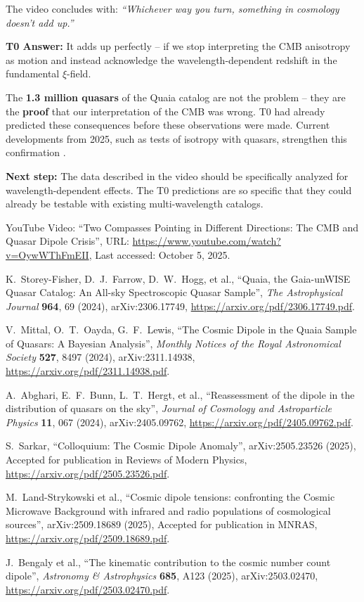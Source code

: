 \documentclass{article}
\begin{document}
	The video concludes with: \textit{``Whichever way you turn, something in cosmology doesn't add up.''}
	
	\textbf{T0 Answer:} It adds up perfectly -- if we stop interpreting the CMB anisotropy as motion and instead acknowledge the wavelength-dependent redshift in the fundamental $\xi$-field.
	
	The \textbf{1.3 million quasars} of the Quaia catalog are not the problem -- they are the \textbf{proof} that our interpretation of the CMB was wrong. T0 had already predicted these consequences before these observations were made. Current developments from 2025, such as tests of isotropy with quasars, strengthen this confirmation \cite{sarkar2025}.
	
	\textbf{Next step:} The data described in the video should be specifically analyzed for wavelength-dependent effects. The T0 predictions are so specific that they could already be testable with existing multi-wavelength catalogs.
	
	\begin{thebibliography}{9}
		
		YouTube Video: ``Two Compasses Pointing in Different Directions: The CMB and Quasar Dipole Crisis'', 
		URL: \url{https://www.youtube.com/watch?v=OywWThFmEII}, 
		Last accessed: October 5, 2025.
		
		K.~Storey-Fisher, D.~J.~Farrow, D.~W.~Hogg, et al.,
		``Quaia, the Gaia-unWISE Quasar Catalog: An All-sky Spectroscopic Quasar Sample'',
		\emph{The Astrophysical Journal} \textbf{964}, 69 (2024),
		arXiv:2306.17749,
		\url{https://arxiv.org/pdf/2306.17749.pdf}.
		
		V.~Mittal, O.~T.~Oayda, G.~F.~Lewis,
		``The Cosmic Dipole in the Quaia Sample of Quasars: A Bayesian Analysis'',
		\emph{Monthly Notices of the Royal Astronomical Society} \textbf{527}, 8497 (2024),
		arXiv:2311.14938,
		\url{https://arxiv.org/pdf/2311.14938.pdf}.
		
		A.~Abghari, E.~F.~Bunn, L.~T.~Hergt, et al.,
		``Reassessment of the dipole in the distribution of quasars on the sky'',
		\emph{Journal of Cosmology and Astroparticle Physics} \textbf{11}, 067 (2024),
		arXiv:2405.09762,
		\url{https://arxiv.org/pdf/2405.09762.pdf}.
		
		S.~Sarkar,
		``Colloquium: The Cosmic Dipole Anomaly'',
		arXiv:2505.23526 (2025),
		Accepted for publication in Reviews of Modern Physics,
		\url{https://arxiv.org/pdf/2505.23526.pdf}.
		
		M.~Land-Strykowski et al.,
		``Cosmic dipole tensions: confronting the Cosmic Microwave Background with infrared and radio populations of cosmological sources'',
		arXiv:2509.18689 (2025),
		Accepted for publication in MNRAS,
		\url{https://arxiv.org/pdf/2509.18689.pdf}.
		
		J.~Bengaly et al.,
		``The kinematic contribution to the cosmic number count dipole'',
		\emph{Astronomy \& Astrophysics} \textbf{685}, A123 (2025),
		arXiv:2503.02470,
		\url{https://arxiv.org/pdf/2503.02470.pdf}.
		
	\end{thebibliography}
	
\end{document}
